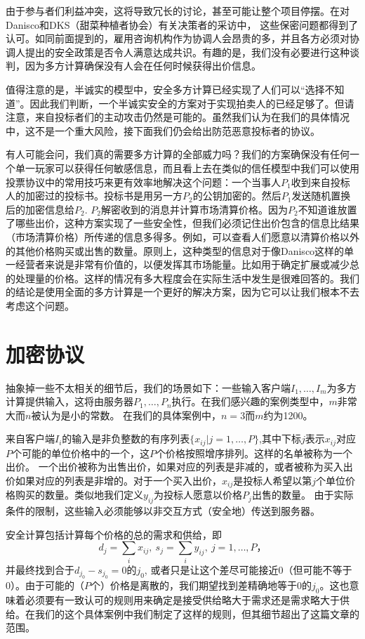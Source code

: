 由于参与者们利益冲突，这将导致冗长的讨论，甚至可能让整个项目停摆。在对Danisco和DKS（甜菜种植者协会）有关决策者的采访中，
这些保密问题都得到了认可。如同前面提到的，雇用咨询机构作为协调人会昂贵的多，并且各方必须对协调人提出的安全政策是否令人满意达成共识。有趣的是，我们没有必要进行这种谈判，因为多方计算确保没有人会在任何时候获得出价信息。

值得注意的是，半诚实的模型中，安全多方计算已经实现了人们可以“选择不知道”。因此我们判断，一个半诚实安全的方案对于实现拍卖人的已经足够了。但请注意，来自投标者们的主动攻击仍然是可能的。虽然我们认为在我们的具体情况中，这不是一个重大风险，接下面我们仍会给出防范恶意投标者的协议。

有人可能会问，我们真的需要多方计算的全部威力吗？我们的方案确保没有任何一个单一玩家可以获得任何敏感信息，而且看上去在类似的信任模型中我们可以使用投票协议中的常用技巧来更有效率地解决这个问题：一个当事人$P_1$收到来自投标人的加密过的投标书。投标书是用另一方$P_2$的公钥加密的。然后$P_1$发送随机置换后的加密信息给$P_2$. $P_2$解密收到的消息并计算市场清算价格。因为$P_2$不知道谁放置了哪些出价，这种方案实现了一些安全性，但我们必须记住出价包含的信息比结果（市场清算价格）所传递的信息多得多。例如，可以查看人们愿意以清算价格以外的其他价格购买或出售的数量。原则上，这种类型的信息对于像Danisco这样的单一经营者来说是非常有价值的，以便发挥其市场能量。比如用于确定扩展或减少总的处理量的价格。这样的情况有多大程度会在实际生活中发生是很难回答的。我们的结论是使用全面的多方计算是一个更好的解决方案，因为它可以让我们根本不去考虑这个问题。

\section{加密协议}
抽象掉一些不太相关的细节后，我们的场景如下：一些输入客户端$I_1,\dots,I_m$为多方计算提供输入，这将由服务器$P_1,\dots,P_n$执行。在我们感兴趣的案例类型中，$m$非常大而$n$被认为是小的常数。 在我们的具体案例中，$n=3$而$m$约为1200。

来自客户端$I_i$的输入是非负整数的有序列表$\{x_{ij}|j=1,\dots,P\}$,其中下标$j$表示$x_{ij}$对应$P$个可能的单位价格中的一个，这$P$个价格按照增序排列。这样的名单被称为一个出价。 一个出价被称为出售出价，如果对应的列表是非减的，或者被称为买入出价如果对应的列表是非增的。对于一个买入出价，$x_{ij}$是投标人希望以第$j$个单位价格购买的数量。类似地我们定义$y_{ij}$为投标人愿意以价格$P_j$出售的数量。 由于实际条件的限制，这些输入必须能够以非交互方式（安全地）传送到服务器。

安全计算包括计算每个价格的总的需求和供给，即
$$
d_j=\sum_{i}x_{ij},\ s_j=\sum_i y_{ij},\ j=1,\dots,P，
$$
并最终找到合于$d_{j_0}-s_{j_0}=0$的$j_0$, 或者只是让这个差尽可能接近0（但可能不等于0）。由于可能的（$P$个）价格是离散的，我们期望找到差精确地等于0的$j_0$。这也意味着必须要有一致认可的规则用来确定是接受供给略大于需求还是需求略大于供给。在我们的这个具体案例中我们制定了这样的规则，但其细节超出了这篇文章的范围。

